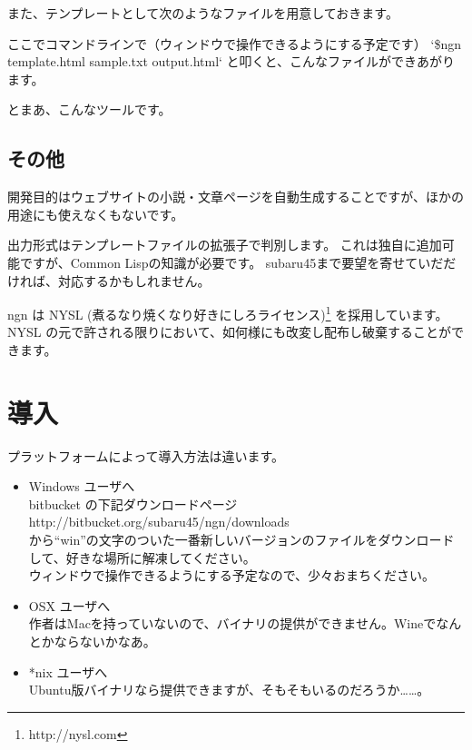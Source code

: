 \documentclass[a4j]{jsarticle}
\begin{document}
また、テンプレートとして次のようなファイルを用意しておきます。



ここでコマンドラインで（ウィンドウで操作できるようにする予定です） `\$ngn template.html sample.txt output.html` と叩くと、こんなファイルができあがります。



とまあ、こんなツールです。


\subsection{その他}

開発目的はウェブサイトの小説・文章ページを自動生成することですが、ほかの用途にも使えなくもないです。

出力形式はテンプレートファイルの拡張子で判別します。
これは独自に追加可能ですが、Common Lispの知識が必要です。
subaru45まで要望を寄せていだだければ、対応するかもしれません。

ngn は NYSL (煮るなり焼くなり好きにしろライセンス)\footnote{http://nysl.com} を採用しています。
NYSL の元で許される限りにおいて、如何様にも改変し配布し破棄することができます。


\section{導入}

プラットフォームによって導入方法は違います。

\begin{itemize}
\item Windows ユーザへ\\
  bitbucket の下記ダウンロードページ \\
  http://bitbucket.org/subaru45/ngn/downloads \\
から``win''の文字のついた一番新しいバージョンのファイルをダウンロードして、好きな場所に解凍してください。\\
  ウィンドウで操作できるようにする予定なので、少々おまちください。\\

\item OSX ユーザへ\\
  作者はMacを持っていないので、バイナリの提供ができません。Wineでなんとかならないかなあ。

\item *nix ユーザへ\\
  Ubuntu版バイナリなら提供できますが、そもそもいるのだろうか……。

\end{itemize}
\end{document}
